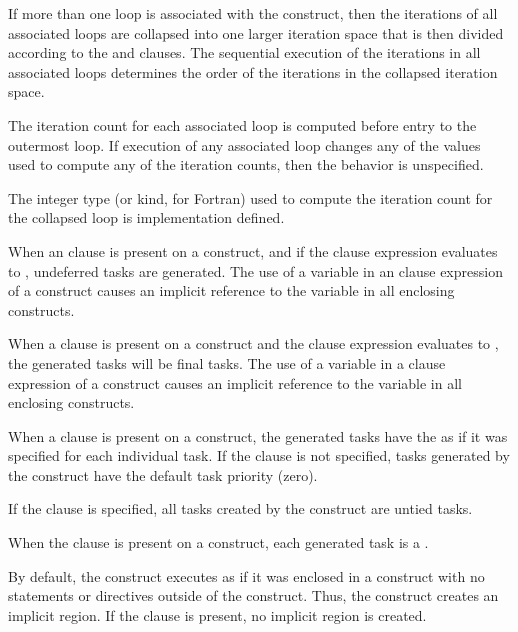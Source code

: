 If more than one loop is associated with the  construct, then the iterations of all associated loops are collapsed into one larger iteration space that is then divided according to the  and  clauses. The sequential execution of the iterations in all associated loops determines the order of the iterations in the collapsed iteration space. 

The iteration count for each associated loop is computed before entry to the outermost loop. If execution of any associated loop changes any of the values used to compute any of the iteration counts, then the behavior is unspecified. 

The integer type (or kind, for Fortran) used to compute the iteration count for the collapsed loop is implementation defined.

When an  clause is present on a  construct, and if the  clause expression evaluates to , undeferred tasks are generated. The use of a variable in an  clause expression of a  construct causes an implicit reference to the variable in all enclosing constructs.

When a  clause is present on a  construct and the  clause expression evaluates to , the generated tasks will be final tasks. The use of a variable in a  clause expression of a  construct causes an implicit reference to the variable in all enclosing constructs.

When a  clause is present on a  construct,
the generated tasks have the  as if it was 
specified for each individual task.  
If the  clause is not specified, tasks generated by 
the  construct have the default task priority (zero).

If the  clause is specified, all tasks created by the  construct are untied tasks.

When the  clause is present on a  construct, each generated task is a . 

By default, the  construct executes as if it was enclosed in a  construct with no statements or directives outside of the  construct. Thus, the  construct creates an implicit  region. If the  clause is present, no implicit  region is created.

